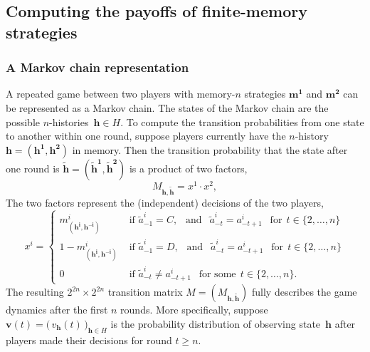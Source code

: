 \documentclass[9pt,twoside,lineno]{pnas-new}
\theoremstyle{plainCl1}
\theoremstyle{plainCl2}
\begin{document}
\subsection{Computing the payoffs of finite-memory strategies} \label{Sec:PayoffComputation}


\subsubsection*{A Markov chain representation}
A repeated game between two players with memory-\(n\) strategies \(\mathbf{m^{1}}\) and \(\mathbf{m^{2}}\) can be represented as a Markov chain. 
The states of the Markov chain are the possible $n$-histories~$\mathbf{h}\!\in\!H$. 
To compute the transition probabilities from one state to another within one round, suppose  players currently have the $n$-history \(\mathbf{h}\!=\!(\mathbf{h^1}, \mathbf{h^2})\) in memory.
Then the transition probability that the state after one round is $\mathbf{\tilde h}\!=\!(\mathbf{\tilde h^1},\mathbf{\tilde h^2})$ is a product of two factors,
\begin{equation}\label{Eq:TransitionMatrix}
M_{\mathbf{h}, \mathbf{\tilde h}} = x^1 \cdot x^2,
\end{equation}
The two factors represent the (independent) decisions of the two players,
\begin{equation}
x^i = \left\{
\begin{array}{ll}
  m^{i}_{(\mathbf{h^i},\mathbf{h^{-i}})} & \text{ if } \tilde{a}^i_{-1} \!=\! C, ~~\text{ and }~~ \tilde a^i_{-t} \!=\! a^i_{-t + 1} ~~\text{ for}~~t\!\in\!\{2,\ldots,n\}\\[0.1cm]
  1 \!-\! m^{i}_{(\mathbf{h^i},\mathbf{h^{-i}})} & \text{ if } \tilde{a}^i_{-1} \!=\! D, ~~\text{ and }~~ \tilde a^i_{-t} \!=\! a^i_{-t + 1} ~~\text{ for}~~t\!\in\!\{2,\ldots,n\}\\[0.1cm]
  0 & \text{ if } \tilde a^i_{-t} \neq  a^i_{-t + 1}~~\text{ for some}~~t\!\in\!\{2,\ldots,n\}.
\end{array}
\right.
\end{equation}
The resulting  \(2^{2n}\! \times\! 2^{2n}\) transition matrix $M\!=\!(M_{\mathbf{h},\mathbf{\tilde h}})$ fully describes the game dynamics after the first $n$ rounds. 
More specifically, suppose $\mathbf{v}(t) \!=\! \big(\,v_\mathbf{h}(t)\,\big)_{\mathbf{h}\in H}$ is the probability distribution of observing state~$\mathbf{h}$ after players made their decisions for round $t\!\ge\!n$.
\end{document}
